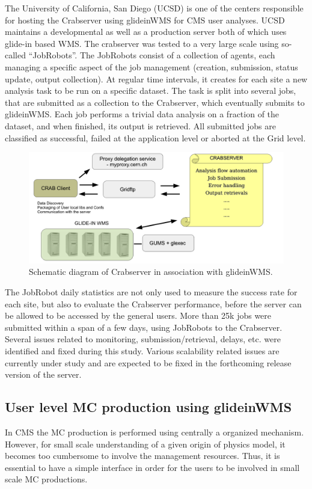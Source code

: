 \documentclass[a4paper]{jpconf}
\begin{document}
The University of California, San Diego (UCSD) is one of the centers responsible for hosting 
the Crabserver using glideinWMS for CMS user analyses. UCSD maintains a developmental as well 
as a production server both of which uses glide-in based WMS. The crabserver was tested to a very large 
scale using so-called ``JobRobots''. The JobRobots consist of a collection of agents, each 
managing a specific aspect of the job management (creation, submission, status
update, output collection). At regular time intervals, it creates for
each site a new analysis task to be run on a specific dataset. The
task is split into several jobs, that are submitted as a collection to
the Crabserver, which eventually submits to glideinWMS. Each job
performs a trivial data analysis on a fraction of the dataset, and when
finished, its output is retrieved. All submitted jobs are classified
as successful, failed at the application level or aborted at the Grid
level.
\begin{figure}
\begin{center}
\includegraphics[scale=0.4]{crabserver}
\end{center}
\caption{Schematic diagram of Crabserver in association with glideinWMS.}
\label{fig:crabserver}
\end{figure}
The JobRobot daily statistics are not only used to measure the success rate for each site, 
but also to evaluate the Crabserver performance, before the server can be allowed 
to be accessed by the general users. More than 25k jobs were submitted within a span of a 
few days, using JobRobots to the Crabserver. Several issues related to monitoring, 
submission/retrieval, delays, etc. were identified and fixed during this study. Various scalability
related issues are currently under study and are expected to be fixed in the forthcoming
release version of the server.
\subsection{User level MC production using glideinWMS}
In CMS the MC production is performed using centrally a organized mechanism. However,
for small scale understanding of a given origin of physics model, it becomes too cumbersome
to involve the management resources. Thus, it is essential to have a simple interface
in order for the users to be involved in small scale MC productions. 
\end{document}
